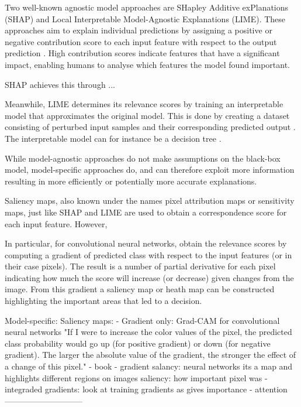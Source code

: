 Two well-known agnostic model approaches are SHapley Additive exPlanations (SHAP) and Local Interpretable Model-Agnostic Explanations (LIME). These approaches aim to explain individual predictions by assigning a positive or negative contribution score to each input feature with respect to the output prediction \cite{lundbergUnifiedApproachInterpreting2017, molnarInterpretableMachineLearning2022}. High contribution scores indicate features that have a significant impact, enabling humans to analyse which features the model found important.

SHAP achieves this through ... %

Meanwhile, LIME determines its relevance scores by training an interpretable model that approximates the original model. This is done by creating a dataset consisting of perturbed input samples and their corresponding predicted output  \citep{ribeiroWhyShouldTrust2016}. The interpretable model can for instance be a decision tree \citep{molnarInterpretableMachineLearning2022}.

While model-agnostic approaches do not make assumptions on the black-box model, model-specific approaches do, and can therefore exploit more information resulting in more efficiently or potentially more accurate explanations.

Saliency maps, also known under the names pixel attribution maps or sensitivity maps, just like SHAP and LIME are used to obtain a correspondence score for each input feature. However,

In particular, for convolutional neural networks, \cite{simonyanDeepConvolutionalNetworks2014} obtain the relevance scores by computing a gradient of predicted class with respect to the input features (or in their case pixels). The result is a number of partial derivative for each pixel indicating how much the score will increase (or decrease) given changes from the image. From this gradient a saliency map or heath map can be constructed highlighting the important areas that led to a decision. 




Model-specific:
Saliency maps:
- Gradient only: Grad-CAM for convolutional neural networks "If I were to increase the color values of the pixel, the predicted class probability would go up (for positive gradient) or down (for negative gradient). The larger the absolute value of the gradient, the stronger the effect of a change of this pixel." - book
- gradient salancy: neural networks
its a map and highlights different regions on images
saliency: how important pixel was
- integraded gradients: look at training gradients as gives importance
- attention
-----------------------------















